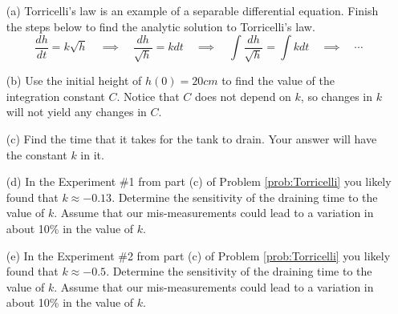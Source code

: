 \begin{problem}
    \begin{enumerate}
        \item[(a)] Torricelli's law is an example of a separable differential equation.
            Finish the steps below to find the analytic solution to Torricelli's law.
            \[  \frac{dh}{dt} = k \sqrt{h} \quad \implies \quad \frac{dh}{\sqrt{h}} = k
                dt \quad \implies \quad \int \frac{dh}{\sqrt{h}} = \int k dt \quad
            \implies \quad \cdots \]
        \item[(b)] Use the initial height of $h(0) = 20cm$ to find the value of the
            integration constant $C$.  Notice that $C$ does not depend on $k$, so changes
            in $k$ will not yield any changes in $C$.
        \item[(c)] Find the time that it takes for the tank to drain.  Your answer will
            have the constant $k$ in it.
        \item[(d)] In the Experiment \#1 from part (c) of Problem \ref{prob:Torricelli} you likely
            found that $k \approx -0.13$.  Determine the sensitivity of the draining time
            to the value of $k$.  Assume that our mis-measurements could lead to a
            variation in about 10\% in the value of $k$.
        \item[(e)] In the Experiment \#2 from part (c) of Problem \ref{prob:Torricelli} you likely
            found that $k \approx -0.5$.  Determine the sensitivity of the draining time
            to the value of $k$.  Assume that our mis-measurements could lead to a
            variation in about 10\% in the value of $k$.
    \end{enumerate}
\end{problem}



